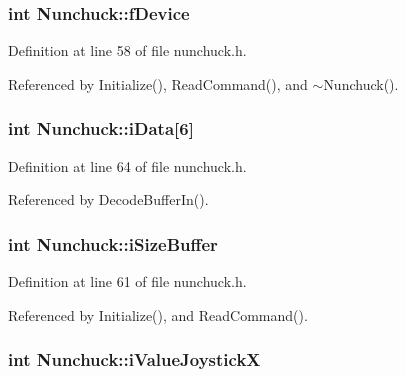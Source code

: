 \hypertarget{classNunchuck_a61f4874769103ba04e13f75a08442f8e}{
\subsubsection[{f\-Device}]{\setlength{\rightskip}{0pt plus 5cm}int Nunchuck\-::f\-Device\hspace{0.3cm}{\ttfamily [private]}}}\label{classNunchuck_a61f4874769103ba04e13f75a08442f8e}


Definition at line 58 of file nunchuck.\-h.



Referenced by Initialize(), Read\-Command(), and $\sim$\-Nunchuck().

\hypertarget{classNunchuck_a6bf3cbe405e9611658f1a6bbc1cd56b4}{
\subsubsection[{i\-Data}]{\setlength{\rightskip}{0pt plus 5cm}int Nunchuck\-::i\-Data\mbox{[}6\mbox{]}\hspace{0.3cm}{\ttfamily [private]}}}\label{classNunchuck_a6bf3cbe405e9611658f1a6bbc1cd56b4}


Definition at line 64 of file nunchuck.\-h.



Referenced by Decode\-Buffer\-In().

\hypertarget{classNunchuck_a671e2732508cdd56e51898b79e58d455}{
\subsubsection[{i\-Size\-Buffer}]{\setlength{\rightskip}{0pt plus 5cm}int Nunchuck\-::i\-Size\-Buffer\hspace{0.3cm}{\ttfamily [private]}}}\label{classNunchuck_a671e2732508cdd56e51898b79e58d455}


Definition at line 61 of file nunchuck.\-h.



Referenced by Initialize(), and Read\-Command().

\hypertarget{classNunchuck_a931870243c74e9df416639c53670b234}{
\subsubsection[{i\-Value\-Joystick\-X}]{\setlength{\rightskip}{0pt plus 5cm}int Nunchuck\-::i\-Value\-Joystick\-X}}\label{classNunchuck_a931870243c74e9df416639c53670b234}


